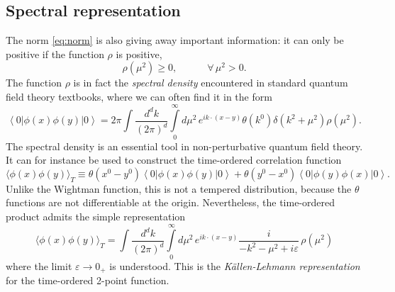 \documentclass[a4paper,12pt]{article}
\newcommand{\ket}[1]{\left| #1 \right\rangle}
\newcommand{\bra}[1]{\left\langle #1 \right|}
\numberwithin{equation}{section}
\begin{document}
\subsection{Spectral representation}

The norm \eqref{eq:norm} is also giving away important information: it can only be positive if the function $\rho$ is positive,
\begin{equation}
	\rho(\mu^2) \geq 0,
	\qquad\quad
	\forall \, \mu^2 > 0.
\end{equation}
The function $\rho$ is in fact the \emph{spectral density} encountered in standard quantum field theory textbooks, where we can often find it in the form
\begin{equation}
	\bra{0} \phi(x) \phi(y) \ket{0}
	= 2\pi \int \frac{d^dk}{(2\pi)^d}
	\int\limits_0^\infty d\mu^2 \,
	e^{i k \cdot (x - y)} \theta(k^0) 
	\delta(k^2 + \mu^2) \rho(\mu^2).
	\label{eq:spectralrepresentation}
\end{equation}
The spectral density is an essential tool in non-perturbative quantum field theory. It can for instance be used to construct the time-ordered correlation function
\begin{equation}
	\langle \phi(x) \phi(y) \rangle_T
	\equiv 
	\theta(x^0 - y^0) \bra{0} \phi(x) \phi(y) \ket{0}
	+ \theta(y^0 - x^0) \bra{0} \phi(y) \phi(x) \ket{0}.
\end{equation}
Unlike the Wightman function, this is not a tempered distribution, because the $\theta$ functions are not differentiable at the origin.
Nevertheless, the time-ordered product admits the simple representation
\begin{equation}
	\langle \phi(x) \phi(y) \rangle_T
	= \int \frac{d^dk}{(2\pi)^d}
	\int\limits_0^\infty d\mu^2 \,
	e^{i k \cdot (x - y)}
	\frac{i}
	{ -k^2 - \mu^2 + i \varepsilon} \, \rho(\mu^2)
	\label{eq:KallenLehmann}
\end{equation}
where the limit $\varepsilon \to 0_+$ is understood.
This is the \emph{Källen-Lehmann representation} for the time-ordered 2-point function.
%
\end{document}
